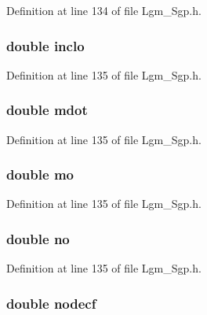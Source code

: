 Definition at line 134 of file Lgm\_\-Sgp.h.\hypertarget{struct___sgp_info_fcbd011ce32e4763767d90522dc42e0e}{
\subsubsection[{inclo}]{\setlength{\rightskip}{0pt plus 5cm}double {\bf inclo}}}
\label{struct___sgp_info_fcbd011ce32e4763767d90522dc42e0e}




Definition at line 135 of file Lgm\_\-Sgp.h.\hypertarget{struct___sgp_info_ee90111c98406414a1db98e8c5102e4f}{
\subsubsection[{mdot}]{\setlength{\rightskip}{0pt plus 5cm}double {\bf mdot}}}
\label{struct___sgp_info_ee90111c98406414a1db98e8c5102e4f}




Definition at line 135 of file Lgm\_\-Sgp.h.\hypertarget{struct___sgp_info_bf05d62d7ad39d494816d23dd19b9325}{
\subsubsection[{mo}]{\setlength{\rightskip}{0pt plus 5cm}double {\bf mo}}}
\label{struct___sgp_info_bf05d62d7ad39d494816d23dd19b9325}




Definition at line 135 of file Lgm\_\-Sgp.h.\hypertarget{struct___sgp_info_b002ef35361da13209d5bf20414b08b1}{
\subsubsection[{no}]{\setlength{\rightskip}{0pt plus 5cm}double {\bf no}}}
\label{struct___sgp_info_b002ef35361da13209d5bf20414b08b1}




Definition at line 135 of file Lgm\_\-Sgp.h.\hypertarget{struct___sgp_info_6ec196aa951f2b53cdbfd43947eb2bce}{
\subsubsection[{nodecf}]{\setlength{\rightskip}{0pt plus 5cm}double {\bf nodecf}}}
\label{struct___sgp_info_6ec196aa951f2b53cdbfd43947eb2bce}




